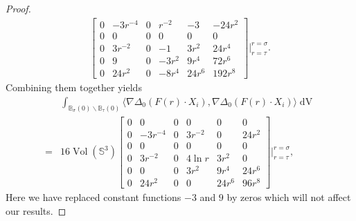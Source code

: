 \documentclass[11pt,letterpaper]{amsart}
\DeclareMathOperator{\Vol}{Vol}
\DeclareMathOperator{\dvol}{dV}
\newcommand{\bB}{\mathbb{B}}
\newcommand{\bS}{\mathbb{S}}
\theoremstyle{definition}
\theoremstyle{remark}
\numberwithin{equation}{section}
\begin{document}
\begin{proof}
\begin{equation}
\begin{split}
\begin{bmatrix}
0 & -3r^{-4} & 0 & r^{-2} & -3& -24r^2\\
0 & 0 & 0& 0& 0 & 0\\
0 & 3r^{-2} & 0 & -1 & 3r^2& 24r^4\\
0 & 9 & 0 & -3r^2 & 9r^4& 72r^6\\
0 & 24r^2 & 0 & -8r^4 & 24r^6& 192r^8
\end{bmatrix}\Big|_{r=\tau}^{r=\sigma}.
    \end{split}
\end{equation}
Combining them together yields
\begin{equation}
\begin{split}
    &\int_{\bB_{\sigma}(0)\backslash \bB_{\tau}(0)}\langle \nabla \Delta_0 (F(r)\cdot X_i), \nabla \Delta_0(F(r)\cdot X_i)\rangle \dvol\\
    =&16 \Vol(\bS^3) \begin{bmatrix}
0 & 0 & 0 & 0 & 0& 0\\
0 & -3r^{-4} & 0 & 3r^{-2} & 0& 24r^2\\
0 & 0 & 0& 0& 0 & 0\\
0 & 3r^{-2} & 0 & {4\ln r} & 3r^2& 0\\
0 & 0 & 0 & 3r^2 & 9r^4& 24r^6\\
0 & 24r^2 & 0 & 0 & 24r^6& 96r^8
\end{bmatrix}\Big|_{r=\tau}^{r=\sigma},
\end{split}
\end{equation}
Here we have replaced constant functions $-3$ and $9$ by zeros which will not affect our results.
\end{proof}
\end{document}
